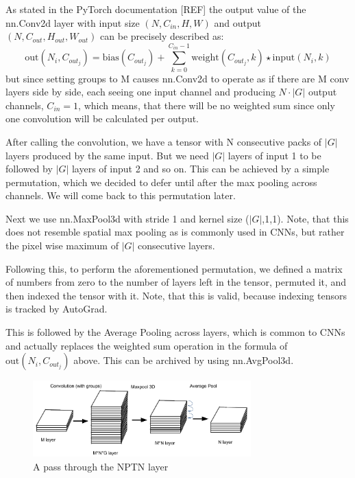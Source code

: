 \documentclass{llncs}
\begin{document}
As stated in the PyTorch documentation [REF] the output value of the nn.Conv2d layer with input size $(N, C_{in}, H, W)$ and output $(N, C_{out}, H_{out}, W_{out})$ can be precisely described as:
\begin{equation*}
\text{out}(N_i, C_{out_j}) = \text{bias}(C_{out_j}) +
\sum_{k = 0}^{C_{in} - 1} \text{weight}(C_{out_j}, k) \star \text{input}(N_i, k)
\end{equation*}
but since setting groups to M causes nn.Conv2d to operate as if there are M conv layers side by side, each seeing one input channel and producing $N\cdot|G|$ output channels, $C_{in} = 1$, which means, that there will be no weighted sum since only one convolution will be calculated per output.

After calling the convolution, we have a tensor with N consecutive packs of $|G|$ layers produced by the same input. But we need $|G|$ layers of input 1 to be followed by $|G|$ layers of input 2 and so on. This can be achieved by a simple permutation, which we decided to defer until after the max pooling across channels. We will come back to this permutation later.

Next we use nn.MaxPool3d with stride 1 and kernel size ($|G|$,1,1). Note, that this does not resemble spatial max pooling as is commonly used in CNNs, but rather the pixel wise maximum of $|G|$ consecutive layers.

Following this, to perform the aforementioned permutation, we defined a matrix of numbers from zero to the number of layers left in the tensor, permuted it, and then indexed the tensor with it. Note, that this is valid, because indexing tensors is tracked by AutoGrad.

This is followed by the Average Pooling across layers, which is common to CNNs and actually replaces the weighted sum operation in the formula of $\text{out}(N_i, C_{out_j})$ above. This can be archived by using nn.AvgPool3d.

\begin{figure}
	\begin{center}
		\includegraphics[width=0.75\textwidth]{result_images/NptnImplementation.png}
		\caption{A pass through the NPTN layer}
		\label{fig:NptnImplementation}
	\end{center}
\end{figure}
\end{document}

